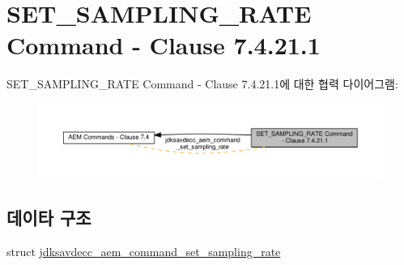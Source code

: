 \hypertarget{group__command__set__sampling__rate}{}\section{S\+E\+T\+\_\+\+S\+A\+M\+P\+L\+I\+N\+G\+\_\+\+R\+A\+TE Command -\/ Clause 7.4.21.1}
\label{group__command__set__sampling__rate}
S\+E\+T\+\_\+\+S\+A\+M\+P\+L\+I\+N\+G\+\_\+\+R\+A\+TE Command -\/ Clause 7.4.21.1에 대한 협력 다이어그램\+:
\nopagebreak
\begin{figure}[H]
\begin{center}
\leavevmode
\includegraphics[width=350pt]{group__command__set__sampling__rate}
\end{center}
\end{figure}
\subsection*{데이타 구조}
\begin{DoxyCompactItemize}
\item 
struct \hyperlink{structjdksavdecc__aem__command__set__sampling__rate}{jdksavdecc\+\_\+aem\+\_\+command\+\_\+set\+\_\+sampling\+\_\+rate}
\end{DoxyCompactItemize}
